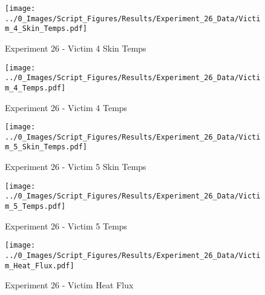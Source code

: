 	\clearpage

	\begin{figure}[H]
		\centering
		\texttt{[image: ../0\_Images/Script\_Figures/Results/Experiment\_26\_Data/Victim\_4\_Skin\_Temps.pdf]}
		\caption[]{Experiment 26 - Victim 4 Skin Temps}
	\end{figure}
 

	\begin{figure}[H]
		\centering
		\texttt{[image: ../0\_Images/Script\_Figures/Results/Experiment\_26\_Data/Victim\_4\_Temps.pdf]}
		\caption[]{Experiment 26 - Victim 4 Temps}
	\end{figure}
 
	\clearpage

	\begin{figure}[H]
		\centering
		\texttt{[image: ../0\_Images/Script\_Figures/Results/Experiment\_26\_Data/Victim\_5\_Skin\_Temps.pdf]}
		\caption[]{Experiment 26 - Victim 5 Skin Temps}
	\end{figure}
 

	\begin{figure}[H]
		\centering
		\texttt{[image: ../0\_Images/Script\_Figures/Results/Experiment\_26\_Data/Victim\_5\_Temps.pdf]}
		\caption[]{Experiment 26 - Victim 5 Temps}
	\end{figure}
 
	\clearpage

	\begin{figure}[H]
		\centering
		\texttt{[image: ../0\_Images/Script\_Figures/Results/Experiment\_26\_Data/Victim\_Heat\_Flux.pdf]}
		\caption[]{Experiment 26 - Victim Heat Flux}
	\end{figure}
 

